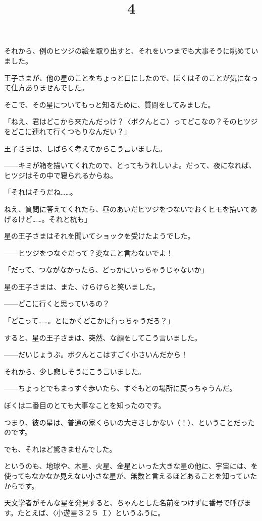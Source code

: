 それから、例のヒツジの絵を取り出すと、それをいつまでも大事そうに眺めていました。


王子さまが、他の星のことをちょっと口にしたので、ぼくはそのことが気になって仕方ありませんでした。

そこで、その星についてもっと知るために、質問をしてみました。

「ねえ、君はどこから来たんだっけ？〈ボクんとこ〉ってどこなの？そのヒツジをどこに連れて行くつもりなんだい？」

王子さまは、しばらく考えてからこう言いました。

——キミが箱を描いてくれたので、とってもうれしいよ。だって、夜になれば、ヒツジはその中で寝られるからね。


「それはそうだね……。

ねえ、質問に答えてくれたら、昼のあいだヒツジをつないでおくヒモを描いてあげるけど……。それと杭も」

星の王子さまはそれを聞いてショックを受けたようでした。

——ヒツジをつなぐだって？変なこと言わないでよ！

「だって、つながなかったら、どっかにいっちゃうじゃないか」

星の王子さまは、また、けらけらと笑いました。

——どこに行くと思っているの？

「どこって……。とにかくどこかに行っちゃうだろ？」

すると、星の王子さまは、突然、な顔をしてこう言いました。

——だいじょうぶ。ボクんとこはすごく小さいんだから！

それから、少し悲しそうにこう言いました。

——ちょっとでもまっすぐ歩いたら、すぐもとの場所に戻っちゃうんだ。

\title{4}


ぼくは二番目のとても大事なことを知ったのです。

つまり、彼の星は、普通の家くらいの大きさしかない（！）、ということだったのです。

でも、それほど驚きませんでした。

というのも、地球や、木星、火星、金星といった大きな星の他に、宇宙には、を使ってもなかなか見えない小さな星が、無数と言えるほどあることを知っていたからです。

天文学者がそんな星を発見すると、ちゃんとした名前をつけずに番号で呼びます。たとえば、〈小遊星３２５ Ｉ〉というふうに。

